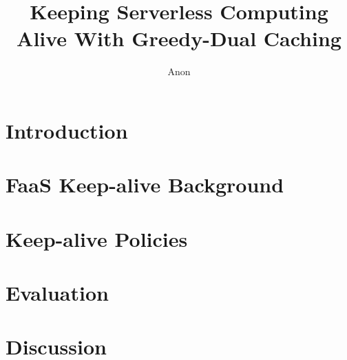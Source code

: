 \documentclass[letterpaper,twocolumn,10pt]{article}
\begin{document}

\date{}

\title{Keeping Serverless Computing Alive With Greedy-Dual Caching}

\author{Anon}

\maketitle 

\begin{abstract}

\end{abstract}


\vspace*{\subsecspace}
\section{Introduction}
\vspace*{\subsecspace}
 



\vspace*{\subsecspace}
\section{FaaS Keep-alive Background}
\vspace*{\subsecspace}
 


\vspace*{\subsecspace}
\section{Keep-alive Policies}
\vspace*{\subsecspace}


\vspace*{\subsecspace}
\section{Evaluation}
\vspace*{\subsecspace}


\clearpage 

\vspace*{\subsecspace}
\section{Discussion}
\vspace*{\subsecspace}





\end{document}
